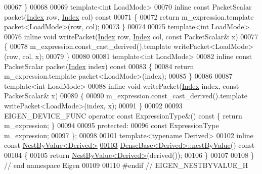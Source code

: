 \begin{DoxyCode}
00067     \}
00068 
00069     \textcolor{keyword}{template}<\textcolor{keywordtype}{int} LoadMode>
00070     \textcolor{keyword}{inline} \textcolor{keyword}{const} PacketScalar packet(\hyperlink{namespace_eigen_a62e77e0933482dafde8fe197d9a2cfde}{Index} row, \hyperlink{namespace_eigen_a62e77e0933482dafde8fe197d9a2cfde}{Index} col)\textcolor{keyword}{ const}
00071 \textcolor{keyword}{    }\{
00072       \textcolor{keywordflow}{return} m\_expression.template packet<LoadMode>(row, col);
00073     \}
00074 
00075     \textcolor{keyword}{template}<\textcolor{keywordtype}{int} LoadMode>
00076     \textcolor{keyword}{inline} \textcolor{keywordtype}{void} writePacket(\hyperlink{namespace_eigen_a62e77e0933482dafde8fe197d9a2cfde}{Index} row, \hyperlink{namespace_eigen_a62e77e0933482dafde8fe197d9a2cfde}{Index} col, \textcolor{keyword}{const} PacketScalar& x)
00077     \{
00078       m\_expression.const\_cast\_derived().template writePacket<LoadMode>(row, col, x);
00079     \}
00080 
00081     \textcolor{keyword}{template}<\textcolor{keywordtype}{int} LoadMode>
00082     \textcolor{keyword}{inline} \textcolor{keyword}{const} PacketScalar packet(\hyperlink{namespace_eigen_a62e77e0933482dafde8fe197d9a2cfde}{Index} index)\textcolor{keyword}{ const}
00083 \textcolor{keyword}{    }\{
00084       \textcolor{keywordflow}{return} m\_expression.template packet<LoadMode>(index);
00085     \}
00086 
00087     \textcolor{keyword}{template}<\textcolor{keywordtype}{int} LoadMode>
00088     \textcolor{keyword}{inline} \textcolor{keywordtype}{void} writePacket(\hyperlink{namespace_eigen_a62e77e0933482dafde8fe197d9a2cfde}{Index} index, \textcolor{keyword}{const} PacketScalar& x)
00089     \{
00090       m\_expression.const\_cast\_derived().template writePacket<LoadMode>(index, x);
00091     \}
00092 
00093     EIGEN\_DEVICE\_FUNC \textcolor{keyword}{operator} \textcolor{keyword}{const} ExpressionType&() \textcolor{keyword}{const} \{ \textcolor{keywordflow}{return} m\_expression; \}
00094 
00095   \textcolor{keyword}{protected}:
00096     \textcolor{keyword}{const} ExpressionType m\_expression;
00097 \};
00098 
00101 \textcolor{keyword}{template}<\textcolor{keyword}{typename} Derived>
00102 \textcolor{keyword}{inline} \textcolor{keyword}{const} \hyperlink{group___core___module_class_eigen_1_1_nest_by_value}{NestByValue<Derived>}
\hyperlink{group___core___module_a3e2761e2b6da74dba1d17b40cc918bf7}{00103} \hyperlink{group___core___module_a3e2761e2b6da74dba1d17b40cc918bf7}{DenseBase<Derived>::nestByValue}()\textcolor{keyword}{ const}
00104 \textcolor{keyword}{}\{
00105   \textcolor{keywordflow}{return} \hyperlink{group___core___module_class_eigen_1_1_nest_by_value}{NestByValue<Derived>}(derived());
00106 \}
00107 
00108 \} \textcolor{comment}{// end namespace Eigen}
00109 
00110 \textcolor{preprocessor}{#endif // EIGEN\_NESTBYVALUE\_H}
\end{DoxyCode}
